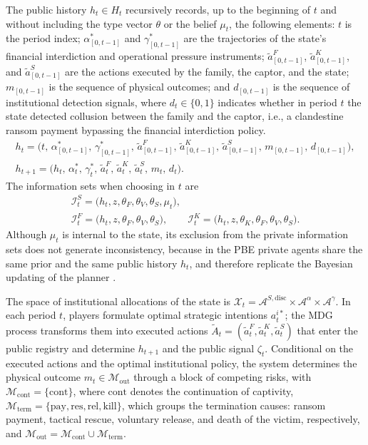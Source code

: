 \documentclass[pdflatex,sn-mathphys-ay]{sn-jnl}
\theoremstyle{plain}
\theoremstyle{definition}
\newcommand{\1}{\mathbf{1}}
\begin{document}
The public history $h_t\in H_t$ recursively records, up to the beginning of $t$ and without including the type vector $\theta$ or the belief $\mu_t$, the following elements: $t$ is the period index; $\alpha^\ast_{[0,t-1]}$ and $\gamma^\ast_{[0,t-1]}$ are the trajectories of the state's financial interdiction and operational pressure instruments; $\tilde{a}^F_{[0,t-1]}$, $\tilde{a}^K_{[0,t-1]}$, and $\tilde{a}^S_{[0,t-1]}$ are the actions executed by the family, the captor, and the state; $m_{[0,t-1]}$ is the sequence of physical outcomes; and $d_{[0,t-1]}$ is the sequence of institutional detection signals, where $d_t\in\{0,1\}$ indicates whether in period $t$ the state detected collusion between the family and the captor, i.e., a clandestine ransom payment bypassing the financial interdiction policy.
\begin{gather}
h_t = \bigl(t,\,\alpha^\ast_{[0,t-1]},\,\gamma^\ast_{[0,t-1]},\,\tilde{a}^F_{[0,t-1]},\,\tilde{a}^K_{[0,t-1]},\,\tilde{a}^S_{[0,t-1]},\,m_{[0,t-1]},\,d_{[0,t-1]}\bigr),\label{eq:historia-publica}\\
h_{t+1} = \bigl(h_t,\,\alpha_t^\ast,\,\gamma_t^\ast,\,\tilde{a}_t^F,\,\tilde{a}_t^K,\,\tilde{a}_t^S,\,m_t,\,d_t\bigr).\label{eq:actualizacion-historia}
\end{gather}
The information sets when choosing in $t$ are
\begin{gather*}
\mathcal{I}_t^S=\bigl(h_t,z,\theta_F,\theta_V,\theta_S,\mu_t\bigr),\\
\mathcal{I}_t^F=\bigl(h_t,z,\theta_F,\theta_V,\theta_S\bigr),\qquad
\mathcal{I}_t^K=\bigl(h_t,z,\theta_K,\theta_F,\theta_V,\theta_S\bigr).
\end{gather*}
Although $\mu_t$ is internal to the state, its exclusion from the private information sets does not generate inconsistency, because in the PBE private agents share the same prior and the same public history $h_t$, and therefore replicate the Bayesian updating of the planner \citet{FudenbergTirole1991}.

The space of institutional allocations of the state is $\mathcal{X}_t=\mathcal{A}^{S,\mathrm{disc}}\times\mathcal{A}^{\alpha}\times\mathcal{A}^{\gamma}$. In each period $t$, players formulate optimal strategic intentions $a_t^{i\ast}$; the MDG process transforms them into executed actions $\tilde{A}_t=(\tilde{a}_t^F,\tilde{a}_t^K,\tilde{a}_t^S)$ that enter the public registry and determine $h_{t+1}$ and the public signal $\zeta_t$. Conditional on the executed actions and the optimal institutional policy, the system determines the physical outcome $m_t\in\mathcal{M}_{\mathrm{out}}$ through a block of competing risks, with $\mathcal{M}_{\mathrm{cont}}=\{\mathrm{cont}\}$, where $\mathrm{cont}$ denotes the continuation of captivity, $\mathcal{M}_{\mathrm{term}}=\{\mathrm{pay},\mathrm{res},\mathrm{rel},\mathrm{kill}\}$, which groups the termination causes: ransom payment, tactical rescue, voluntary release, and death of the victim, respectively, and $\mathcal{M}_{\mathrm{out}}=\mathcal{M}_{\mathrm{cont}}\cup\mathcal{M}_{\mathrm{term}}$.
\end{document}
